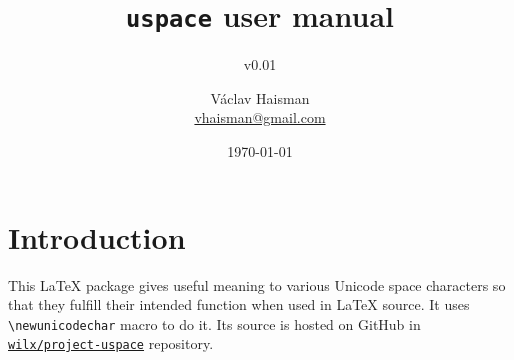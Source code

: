 \documentclass[paper=B5,DIV=calc,parskip=half]{scrartcl}
\author{Václav Haisman\texorpdfstring{%
    \\{\small\href{mailto:vhaisman+uspace@gmail.com?subject=[uspace]}{vhaisman@gmail.com}}}{}}
\date{\today}
\title{\texttt{uspace} user manual}
\subtitle{v0.01}
\begin{document}
\begin{titlepage}
  \maketitle
\end{titlepage}

\tableofcontents

\section{Introduction}%
%
This \LaTeX{} package gives useful meaning to various Unicode space
characters so that they fulfill their intended function when used in \LaTeX{}
source. It uses \lstinline|\newunicodechar| macro to do it. Its source is
hosted on GitHub in
\texttt{\href{https://github.com/wilx/project-uspace}{wilx/project-uspace}}
repository.
\end{document}
